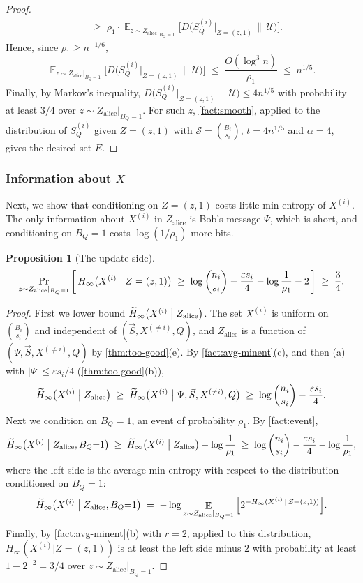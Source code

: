 \documentclass[11pt]{article}
\theoremstyle{plain}
\newtheorem{proposition}[theorem]{Proposition}
\theoremstyle{definition}
\theoremstyle{remark}
\newcommand{\eps}{\varepsilon}
\newcommand{\E}{\mathop{\mathbb{E}}}
\newcommand{\abs}[1]{\left|#1\right|}
\newcommand{\cS}{\mathcal{S}}
\providecommand{\cU}{\mathcal{U}}
\newcommand{\Hmin}{H_\infty}
\newcommand{\tHmin}{\widetilde{H}_\infty}
\newcommand{\vS}{\vec{S}}
\begin{document}
\begin{proof}
\begin{align*}
\;&\ge\; \rho_1 \cdot \E_{z \sim Z_{\mathrm{alice}}|_{B_Q=1}}\Big[D\big(S_Q^{(i)}|_{Z = (z, 1)} \,\big\|\, \cU\big)\Big].
\end{align*}
Hence, since $\rho_1 \ge n^{-1/6}$,
\[ \E_{z \sim Z_{\mathrm{alice}}|_{B_Q=1}}\Big[D\big(S_Q^{(i)}|_{Z = (z, 1)} \,\big\|\, \cU\big)\Big] \;\le\; \frac{O(\log^3 n)}{\rho_1} \;\le\; n^{1/5}. \]
Finally, by Markov's inequality, $D\big(S_Q^{(i)}|_{Z = (z, 1)} \,\|\, \cU\big) \le 4 n^{1/5}$ with probability at least $3/4$ over $z \sim Z_{\mathrm{alice}}|_{B_Q=1}$. For such $z$, \cref{fact:smooth}, applied to the distribution of $S_Q^{(i)}$ given $Z = (z, 1)$ with $\cS = \binom{B_i}{s_i}$, $t = 4 n^{1/5}$ and $\alpha = 4$, gives the desired set $E$.
\end{proof}

\subsubsection{Information about \texorpdfstring{$X$}{X}}

Next, we show that conditioning on $Z = (z, 1)$ costs little min-entropy of $X^{(i)}$. The only information about $X^{(i)}$ in $Z_{\mathrm{alice}}$ is Bob's message $\Psi$, which is short, and conditioning on $B_Q = 1$ costs $\log(1/\rho_1)$ more bits.

\begin{proposition}[The update side]\label{prop:X-leak}
\[ \Pr_{z \sim Z_{\mathrm{alice}}|_{B_Q=1}}\left[\, \Hmin\big( X^{(i)} \bigm| Z = (z, 1) \big) \;\ge\; \log\binom{n_i}{s_i} - \frac{\eps s_i}{4} - \log\frac{1}{\rho_1} - 2 \,\right] \;\ge\; \frac34. \]
\end{proposition}
\begin{proof}
First we lower bound $\tHmin\big(X^{(i)} \bigm| Z_{\mathrm{alice}}\big)$. The set $X^{(i)}$ is uniform on $\binom{B_i}{s_i}$ and independent of $(\vS, X^{(\ne i)}, Q)$, and $Z_{\mathrm{alice}}$ is a function of $(\Psi, \vS, X^{(\ne i)}, Q)$ by \cref{thm:too-good}(e). By \cref{fact:avg-minent}(c), and then (a) with $\abs{\Psi} \le \eps s_i/4$ (\cref{thm:too-good}(b)),
\[ \tHmin\big(X^{(i)} \bigm| Z_{\mathrm{alice}}\big) \;\ge\; \tHmin\big(X^{(i)} \bigm| \Psi, \vS, X^{(\ne i)}, Q\big) \;\ge\; \log\binom{n_i}{s_i} - \frac{\eps s_i}{4}. \]
Next we condition on $B_Q = 1$, an event of probability $\rho_1$. By \cref{fact:event},
\[ \tHmin\big(X^{(i)} \bigm| Z_{\mathrm{alice}}, B_Q {=} 1\big) \;\ge\; \tHmin\big(X^{(i)} \bigm| Z_{\mathrm{alice}}\big) - \log\frac{1}{\rho_1} \;\ge\; \log\binom{n_i}{s_i} - \frac{\eps s_i}{4} - \log\frac{1}{\rho_1}, \]
where the left side is the average min-entropy with respect to the distribution conditioned on $B_Q = 1$:
\[ \tHmin\big(X^{(i)} \bigm| Z_{\mathrm{alice}}, B_Q {=} 1\big) \;=\; -\log \E_{z \sim Z_{\mathrm{alice}}|_{B_Q=1}}\Big[2^{-\Hmin(X^{(i)} \,|\, Z = (z, 1))}\Big]. \]
Finally, by \cref{fact:avg-minent}(b) with $r = 2$, applied to this distribution, $\Hmin(X^{(i)} | Z = (z, 1))$ is at least the left side minus $2$ with probability at least $1 - 2^{-2} = 3/4$ over $z \sim Z_{\mathrm{alice}}|_{B_Q=1}$.
\end{proof}
\end{document}
